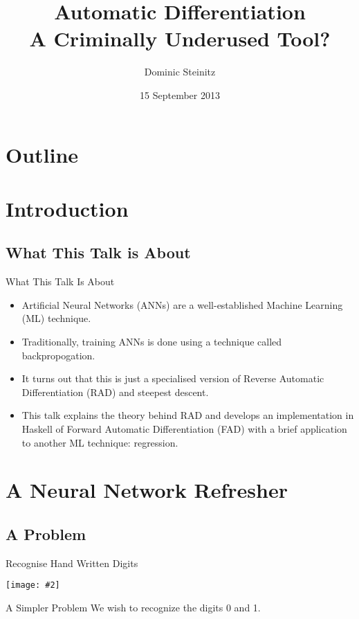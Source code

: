 \documentclass{beamer}
\title[Automatic differentiation]{Automatic Differentiation\\A Criminally Underused Tool?}
\author{Dominic Steinitz}
\institute{Kingston University}
\date{15 September 2013}
\newcommand {\framedgraphic}[2] {
    \begin{frame}{#1}
        \begin{center}
            \texttt{[image: \#2]}
        \end{center}
    \end{frame}
}
\begin{document}
\begin{frame}
\titlepage
\end{frame}

\section*{Outline}
    \frame{\tableofcontents}

\section{Introduction}

\subsection{What This Talk is About}

\begin{frame}{What This Talk Is About}

  \begin{itemize}
  \item Artificial Neural Networks (ANNs) are a well-established
    Machine Learning (ML) technique.
  \item Traditionally, training ANNs is done using a technique called
    backpropogation.
  \item It turns out that this is just a specialised version of
    Reverse Automatic Differentiation (RAD) and steepest descent.
  \item This talk explains the theory behind RAD and develops an
    implementation in Haskell of Forward Automatic Differentiation
    (FAD) with a brief application to another ML technique:
    regression.
  \end{itemize}

\end{frame}

\section{A Neural Network Refresher}

\subsection{A Problem}

\framedgraphic{Recognise Hand Written Digits}{diagrams/mnist_originals.png}

\begin{frame}[fragile]{A Simpler Problem}
We wish to recognize the digits 0 and 1.
\end{frame}
\end{document}
